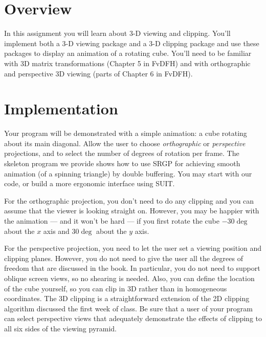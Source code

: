 



%

\section{Overview}

In this assignment you will learn about 3-D viewing and clipping. 
You'll implement both a 3-D viewing package and a 3-D clipping package 
and use these packages to display an animation of a rotating cube. 
You'll need to be familiar with 3D matrix transformations (Chapter 
5 in FvDFH) and with orthographic and perspective 3D viewing (parts 
of Chapter 6 in FvDFH).

\section{Implementation}

Your program will be demonstrated with a simple animation: a cube 
rotating about its main diagonal. Allow the user to choose {\em 
orthographic\/} or {\em perspective\/} projections, and to select 
the number of degrees of rotation per frame. The skeleton program 
we provide shows how to use SRGP for achieving smooth animation (of 
a spinning triangle) by double buffering. You may start with our 
code, or build a more ergonomic interface using SUIT. 

For the orthographic projection, you don't need to do any clipping 
and you can assume that the viewer is looking straight on. However, 
you may be happier with the animation --- and it won't be hard --- 
if you first rotate the cube $-30\deg$ about the $x$ axis and 
$30\deg$ about the $y$ axis.

For the perspective projection, you need to let the user set a viewing 
position and clipping planes. However, you do not need to give the 
user all the degrees of freedom that are discussed in the book. In 
particular, you do not need to support oblique screen views, so no 
shearing is needed. Also, you can define the location of the cube yourself, 
so you can clip in 3D rather than in homogeneous coordinates. The 
3D clipping is a straightforward extension of the 2D clipping algorithm 
discussed the first week of class. Be sure that a user of your program 
can select perspective views that adequately demonstrate the effects 
of clipping to all six sides of the viewing pyramid. 

